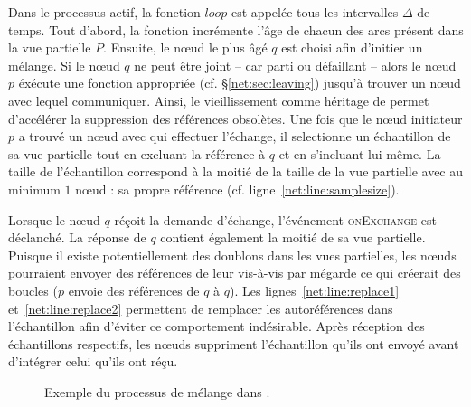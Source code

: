 Dans le processus actif, la fonction $loop$ est appelée tous les intervalles
$\Delta$ de temps. Tout d'abord, la fonction incrémente l'âge de chacun des arcs
présent dans la vue partielle $P$. Ensuite, le nœud le plus âgé $q$ est choisi
afin d'initier un mélange. Si le nœud $q$ ne peut être joint -- car parti ou
défaillant -- alors le nœud $p$ éxécute une fonction appropriée (cf.
§\ref{net:sec:leaving}) jusqu'à trouver un nœud avec lequel communiquer. Ainsi,
le vieillissement comme héritage de \CYCLON permet d'accélérer la suppression
des références obsolètes. Une fois que le nœud initiateur $p$ a trouvé un nœud
avec qui effectuer l'échange, il selectionne un échantillon de sa vue partielle
tout en excluant la référence à $q$ et en s'incluant lui-même. La taille de
l'échantillon correspond à la moitié de la taille de la vue partielle avec au
minimum $1$ nœud : sa propre référence (cf. ligne~\ref{net:line:samplesize}). 

Lorsque le nœud $q$ réçoit la demande d'échange, l'événement \textsc{onExchange}
est déclanché. La réponse de $q$ contient également la moitié de sa vue
partielle. Puisque il existe potentiellement des doublons dans les vues
partielles, les nœuds pourraient envoyer des références de leur vis-à-vis par
mégarde ce qui créerait des boucles ($p$ envoie des références de $q$ à
$q$). Les lignes~\ref{net:line:replace1} et~\ref{net:line:replace2} permettent de
remplacer les autoréférences dans l'échantillon afin d'éviter ce comportement
indésirable. Après réception des échantillons respectifs, les nœuds suppriment
l'échantillon qu'ils ont envoyé avant d'intégrer celui qu'ils ont réçu.

\begin{figure*}
  \centering
  \hspace{40pt}
  \hspace{10pt}
  \caption{\label{net:fig:cyclicexample}Exemple du processus de mélange dans \SPRAY.}
\end{figure*}

